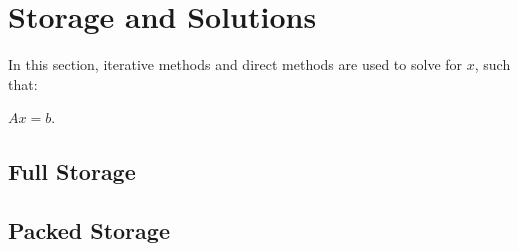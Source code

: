 \documentclass[12pt,a4paper]{article}
\begin{document}
\section{Storage and Solutions}
In this section, iterative methods and direct methods are used to solve for $x$, such that:
\\
\begin{center}
$Ax=b$.
\\
\end{center}

\subsection{Full Storage}

\subsection{Packed Storage}
\end{document}

